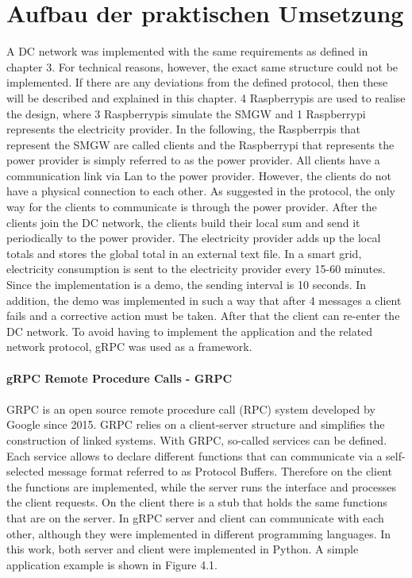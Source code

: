 \section{Aufbau der praktischen Umsetzung}
A DC network was implemented with the same requirements as defined in chapter 3. For technical reasons, however, the exact same structure could not be implemented. If there are any deviations from the defined protocol, then these will be described and explained in this chapter.
4 Raspberrypis are used to realise the design, where 3 Raspberrypis simulate the SMGW and 1 Raspberrypi represents the electricity provider.  In the following, the Raspberrpis that represent the SMGW are called clients and the Raspberrypi that represents the power provider is simply referred to as the power provider. All clients have a communication link via Lan to the power provider. However, the clients do not have a physical connection to each other. As suggested in the protocol, the only way for the clients to communicate is through the power provider. After the clients join the DC network, the clients build their local sum and send it periodically to the power provider. The electricity provider adds up the local totals and stores the global total in an external text file. In a smart grid, electricity consumption is sent to the electricity provider every 15-60 minutes. Since the implementation is a demo, the sending interval is 10 seconds. In addition, the demo was implemented in such a way that after 4 messages a client fails and a corrective action must be taken. After that the client can re-enter the DC network. To avoid having to implement the application and the related network protocol, gRPC was used as a framework.\\
\\
\textbf{gRPC Remote Procedure Calls - GRPC}
\\
\\
GRPC is an open source remote procedure call (RPC) system developed by Google since 2015. GRPC relies on a client-server structure and simplifies the construction of linked systems. With GRPC, so-called services can be defined. Each service allows to declare different functions that can communicate via a self-selected message format referred to as Protocol Buffers. Therefore on the client the functions are implemented, while the server runs the interface and processes the client requests. On the client there is a stub that holds the same functions that are on the server. In gRPC server and client can communicate with each other, although they were implemented in different programming languages. In this work, both server and client were implemented in Python. A simple application example is shown in Figure 4.1.
